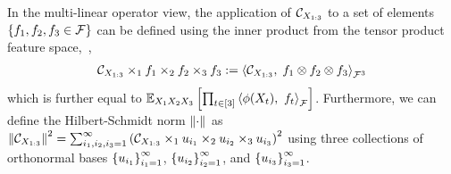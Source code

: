 \documentclass{article}
\begin{document}
In the multi-linear operator view,
the application of $\mathcal{C}_{X_{1:3}}$ to a set of elements $\left\{f_1,f_2,f_3 \in \mathcal{F}\right\}$ can be defined using the inner product from the tensor product feature space,~\ie,
\begin{align*}
	\mathcal{C}_{X_{1:3}} \times_1 f_1 \times_2 f_2 \times_3 f_3
	:= \left\langle \mathcal{C}_{X_{1:3}},\;f_1\otimes f_2\otimes f_3 \right\rangle_{\mathcal{F}^3}
\end{align*}
which is further equal to $\mathbb{E}_{X_1X_2X_3}\left[\prod_{t \in [3]} \left\langle \phi(X_t),~f_t \right\rangle_{\mathcal{F}}\right]$.
Furthermore, we can define the Hilbert-Schmidt norm $\left\|\cdot\right\|_{}$ as
$
 \left\|\mathcal{C}_{X_{1:3}}\right\|_{}^2 = \sum_{i_1,i_2,i_3 = 1}^\infty \left(\mathcal{C}_{X_{1:3}} \times_1 u_{i_1} \times_2 u_{i_2} \times_3 u_{i_3}\right)^2
$
using three collections of orthonormal bases $\left\{u_{i_1}\right\}_{i_1=1}^\infty$, $\left\{u_{i_2}\right\}_{i_2=1}^\infty$, and $\left\{u_{i_3}\right\}_{i_3=1}^\infty$.
\end{document}
